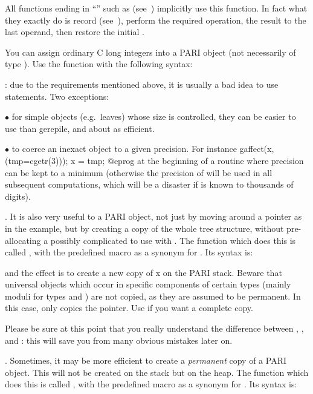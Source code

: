 All functions ending in ``'' such as 
(see~) implicitly use this function. In fact what they
exactly do is record {} (see~), perform the
required operation,  the result to the last operand, then
restore the initial .

You can assign ordinary C long integers into a PARI object (not necessarily
of type ). Use the function  with the following
syntax:


: due to the requirements mentioned above, it is usually
a bad idea to use  statements. Two exceptions:

$\bullet$ for simple objects (e.g.~leaves) whose size is controlled, they can
be easier to use than gerepile, and about as efficient.

$\bullet$ to coerce an inexact object to a given precision. For instance
\bprog
gaffect(x, (tmp=cgetr(3))); x = tmp;
@eprog
\noindent at the beginning of a routine where precision can be kept to a
minimum (otherwise the precision of  will be used in all subsequent
computations, which will be a disaster if  is known to thousands of
digits).

. It is also very useful to  a PARI object, not
just by moving around a pointer as in the  example, but by
creating a copy of the whole tree structure, without pre-allocating a
possibly complicated  to use with . The function which
does this is called , with the predefined macro
 as a synonym for . Its syntax is:


\noindent and the effect is to create a new copy of x on the PARI stack.
Beware that universal objects which occur in specific components of certain
types (mainly moduli for types  and ) are not
copied, as they are assumed to be permanent. In this case,  only
copies the pointer. Use  if you want a complete
copy.

Please be sure at this point that you really understand the difference between
, , and : this will save you
from many obvious mistakes later on.

.
Sometimes, it may be more efficient to create a \emph{permanent} copy of a
PARI object. This will not be created on the stack but on the heap. The
function which does this is called , with the predefined macro
 as a synonym for . Its syntax is:


